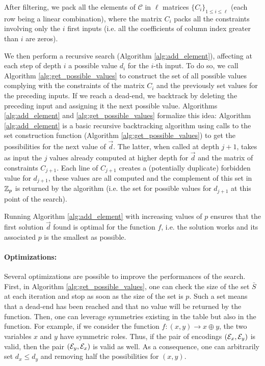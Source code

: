 After filtering, we pack all the elements of $\mathcal{C}$ in $\ell$ matrices $\{C_i\}_{1 \le i \le \ell}$ (each row being a linear combination), where the matrix $C_i$ packs all the constraints involving only the $i$ first inputs (i.e. all the coefficients of column index greater than $i$ are zeros).


We then perform a recursive search (Algorithm \ref{alg:add_element}), affecting at each step of depth $i$ a possible value $d_i$ for the $i$-th input. To do so, we call Algorithm \ref{alg:get_possible_values} to construct the set of all possible values complying with the constraints of the matrix $C_i$ and the previously set values for the preceding inputs. If we reach a dead-end, we backtrack by deleting the preceding input and assigning it the next possible value. Algorithms \ref{alg:add_element} and \ref{alg:get_possible_values} formalize this idea: Algorithm \ref{alg:add_element} is a  basic recursive backtracking algorithm using calls to the set construction function (Algorithm \ref{alg:get_possible_values}) to get the possibilities for the next value of $\vec{d}$. The latter, when called at depth $j+1$, takes as input the 
$j$ values already computed at higher depth for $\vec{d}$ and the matrix of constraints $C_{j+1}$. Each line of $C_{j+1}$ creates a (potentially duplicate) forbidden value for $d_{j+1}$, these values are all computed and the complement of this set in $\mathbb{Z}_p$ is returned by the algorithm (i.e. the set for possible values for $d_{j+1}$ at this point of the search).

\begin{theorem}
     Running Algorithm \ref{alg:add_element} with increasing values of $p$ ensures that the first solution $\vec d$ found is optimal for the function $f$, i.e. the solution works and its associated $p$ is the smallest as possible.   
\end{theorem}






\paragraph{Optimizations:} Several optimizations are possible to improve the performances of the search. First, in Algorithm \ref{alg:get_possible_values}, one can check the size of the set $\bar S$ at each iteration and stop as soon as the size of the set is $p$. Such a set means that a dead-end has been reached and that no value will be returned by the function. Then, one can leverage symmetries existing in the table but also in the function. For example, if we consider the function $f: (x, y) \longrightarrow x \oplus y$, the two variables $x$ and $y$ have symmetric roles. Thus, if the pair of encodings $(\mathcal{E}_x, \mathcal{E}_y)$ is valid, then the pair $(\mathcal{E}_y, \mathcal{E}_x)$ is valid as well. As a consequence, one can arbitrarily set $d_x \le d_y$ and removing half the possibilities for $(x, y)$.




